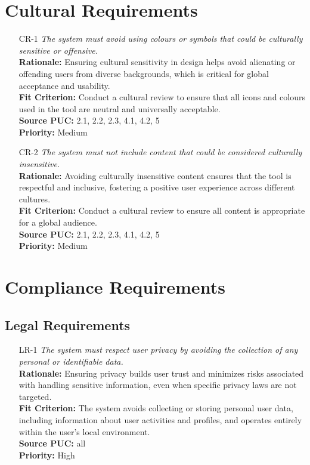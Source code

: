 \documentclass[12pt]{article}
\begin{document}
\section{Cultural Requirements}
\begin{itemize}[leftmargin=*]
  \item[CR-1] \emph{The system must avoid using colours or symbols that could be
          culturally sensitive or offensive.}\\[2mm]
        \textbf{Rationale:} Ensuring cultural sensitivity in design helps avoid alienating or offending users from diverse backgrounds, which is critical for global acceptance and usability.\\
        \textbf{Fit Criterion:} Conduct a cultural review to ensure that all icons and colours used in the tool are neutral and universally acceptable.\\
        \textbf{Source PUC:} 2.1, 2.2, 2.3, 4.1, 4.2, 5 \\
        \textbf{Priority:} Medium

  \item[CR-2] \emph{The system must not include content that could be considered
          culturally insensitive.}\\[2mm]
        \textbf{Rationale:} Avoiding culturally insensitive content ensures that the tool is respectful and inclusive, fostering a positive user experience across different cultures.\\
        \textbf{Fit Criterion:} Conduct a cultural review to ensure all content is appropriate for a global audience.\\
        \textbf{Source PUC:} 2.1, 2.2, 2.3, 4.1, 4.2, 5 \\
        \textbf{Priority:} Medium
\end{itemize}

\section{Compliance Requirements}
\subsection{Legal Requirements}
\begin{itemize}[leftmargin=*]
  \item[LR-1] \emph{The system must respect user privacy by avoiding the collection of
          any personal or identifiable data.}\\[2mm]
        \textbf{Rationale:} Ensuring privacy builds user trust and minimizes risks associated with handling sensitive information, even when specific privacy laws are not targeted.\\
        \textbf{Fit Criterion:} The system avoids collecting or storing personal user data, including information about user activities and profiles, and operates entirely within the user's local environment.\\
        \textbf{Source PUC:} all \\
        \textbf{Priority:} High
\end{itemize}
\end{document}
